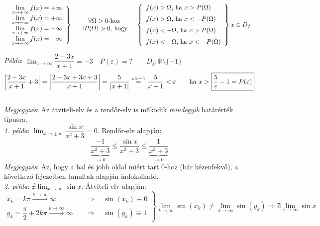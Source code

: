 \documentclass[a4paper,12pt,twoside]{book}
\theoremstyle{break}
\theoremstyle{plain}
\begin{document}
\[\begin{array}{rcl}
\left.\begin{array}{l}
\displaystyle\lim_{x\to +\infty} f(x) = +\infty \\
\displaystyle\lim_{x\to -\infty} f(x) = +\infty \\
\displaystyle\lim_{x\to +\infty} f(x) = -\infty \\
\displaystyle\lim_{x\to -\infty} f(x) = -\infty \\
\end{array}\right\} &

\begin{array}{c} 
 \forall\Omega>0 \hbox{-hoz}\\
 \exists P(\Omega)>0 \hbox{, hogy}
\end{array} &

\left\{\begin{array}{l}
f(x)>\Omega \hbox{, ha } x>P(\Omega)  \\[+6pt]
f(x)>\Omega \hbox{, ha } x<-P(\Omega)  \\[+6pt]
f(x)<-\Omega \hbox{, ha } x>P(\Omega)  \\[+6pt]
f(x)<-\Omega \hbox{, ha } x<-P(\Omega)
\end{array}\right\} x\in D_f

\end{array} \]

\emph{Példa}: $\displaystyle \lim_{x\to \infty} \dfrac{2-3x}{x+1} = -3 \quad P(\varepsilon)=? \qquad D_f:\mathbb{R}\setminus\{-1\}$\\
\[\left|\frac{2-3x}{x+1}+3\right|=\left|\frac{2-3x+3x+3}{x+1}\right| = \frac{5}{|x+1|} \overset{x>-1}{=} \frac{5}{x+1} < \varepsilon \qquad \hbox{ha } x>\boxed{\frac{5}{\varepsilon}-1=P(\varepsilon)} \]\\

\emph{Megjegyzés}: Az átviteli-elv és a rendőr-elv is működik \emph{mindegyik} határérték típusra.\\

\emph{1. példa}: $\displaystyle \lim_{x\to \pm\infty} \dfrac{\sin x}{x^2+3} = 0$. Rendőr-elv alapján:
\[\underbrace{\frac{-1}{x^2+3}}_{\to 0} \leqslant \frac{\sin x}{x^2+3} \leqslant \underbrace{\frac{1}{x^2+3}}_{\to 0}\]
\emph{Megjegyzés}: Az, hogy a bal és jobb oldal miért tart 0-hoz (bár kézenfekvő), a következő fejezetben tanultak alapján indokolható.\\

\emph{2. példa}: $\displaystyle \nexists \lim_{x\to\infty} \sin x$. Átviteli-elv alapján:\\
\[\left.\begin{array}{ll}
    x_k = k\pi \xrightarrow{k\to\infty} \infty & \quad \Rightarrow \quad \sin(x_k) \equiv 0 \\[+5pt]
    y_k = \dfrac{\pi}{2}+2k\pi \xrightarrow{k\to\infty} \infty & \quad \Rightarrow \quad \sin(y_k) \equiv 1
  \end{array}\right\} \lim_{k\to\infty}\sin(x_k) \neq \lim_{k\to\infty}\sin(y_k) \Rightarrow \nexists \lim_{x\to\infty}\sin x
\]
\end{document}
